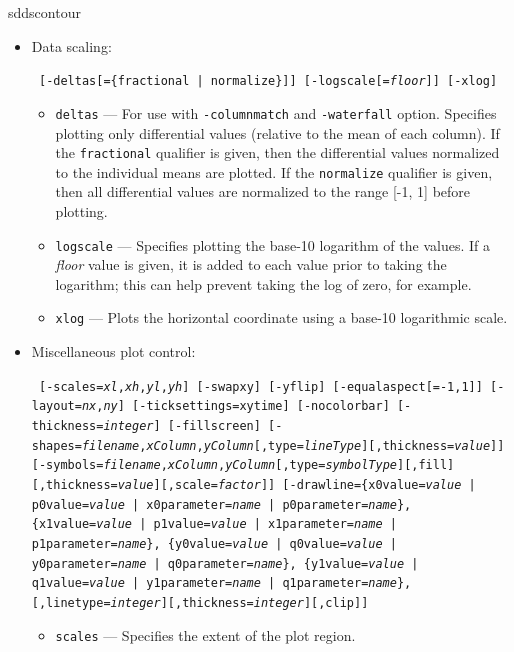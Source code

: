 \begin{sddsprog}{sddscontour}
\begin{itemize}
    \item Data scaling:
\begin{flushleft}{\tt
[-deltas[=\{fractional | normalize\}]] [-logscale[={\em floor}]] [-xlog]
}\end{flushleft}
        \begin{itemize}
        \item \verb|deltas| --- For use with \verb|-columnmatch| and \verb|-waterfall| option.  Specifies plotting
        only differential values (relative to the mean of each column).  If the \verb|fractional|
        qualifier is given, then the differential values normalized to the individual
        means are plotted.  If the \verb|normalize| qualifier is given, then all differential values
        are normalized to the range [-1, 1] before plotting.
        \item \verb|logscale| --- Specifies plotting the base-10 logarithm of the values.  If a
        {\em floor} value is given, it is added to each value prior to taking the logarithm; this
        can help prevent taking the log of zero, for example.
        \item \verb|xlog| --- Plots the horizontal coordinate using a base-10 logarithmic scale.
        \end{itemize}
    \item Miscellaneous plot control:
\begin{flushleft}{\tt
[-scales={\em xl},{\em xh},{\em yl},{\em yh}]
[-swapxy] [-yflip] [-equalaspect[={-1,1}]]
[-layout={\em nx},{\em ny}] [-ticksettings={xy}time]
[-nocolorbar] [-thickness={\em integer}] [-fillscreen]
[-shapes={\em filename},{\em xColumn},{\em yColumn}[,type={\em lineType}][,thickness={\em value}]]
[-symbols={\em filename},{\em xColumn},{\em yColumn}[,type={\em symbolType}][,fill][,thickness={\em value}][,scale={\em factor}]]
[-drawline=\{x0value={\em value} | p0value={\em value} | x0parameter={\em name} | p0parameter={\em name}\},
            \{x1value={\em value} | p1value={\em value} | x1parameter={\em name} | p1parameter={\em name}\},
            \{y0value={\em value} | q0value={\em value} | y0parameter={\em name} | q0parameter={\em name}\},
            \{y1value={\em value} | q1value={\em value} | y1parameter={\em name} | q1parameter={\em name}\},
            [,linetype={\em integer}][,thickness={\em integer}][,clip]]
}\end{flushleft}
        \begin{itemize}
        \item \verb|scales| --- Specifies the extent of the plot region.

\end{itemize}
\end{itemize}
\end{sddsprog}
